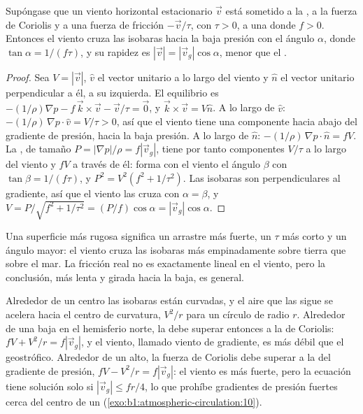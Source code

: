 \begin{proposition}\label{prop:b1:atmospheric-circulation:friction}
Supóngase que un viento horizontal estacionario $\vec v$ está sometido a la , a la fuerza de Coriolis y a una fuerza de fricción $-\vec v/\tau$, con $\tau > 0$, a una  donde $f > 0$. Entonces el viento cruza las isobaras hacia la baja presión con el ángulo $\alpha$, donde $\tan\alpha = 1/(f\tau)$, y su rapidez es $|\vec v| =
|\vec v_g|\cos\alpha$, menor que el .
\end{proposition}

\begin{proof}
Sea $V = |\vec v|$, $\hat v$ el vector unitario a lo largo del viento y $\hat n$ el vector unitario perpendicular a él, a su izquierda. El equilibrio es $-(1/\rho)\nabla p - f\,
\vec k\times\vec v - \vec v/\tau = \vec 0$, y $\vec k\times\vec v = V\hat n$.
A lo largo de $\hat v$: $-(1/\rho)\,\nabla p\cdot\hat v = V/\tau > 0$, así que el viento tiene una componente hacia abajo del gradiente de presión, hacia la baja presión. A lo largo de $\hat n$:
$-(1/\rho)\,\nabla p\cdot\hat n = fV$. La , de tamaño $P =
|\nabla p|/\rho = f|\vec v_g|$, tiene por tanto componentes $V/\tau$ a lo largo del viento y
$fV$ a través de él: forma con el viento el ángulo $\beta$ con $\tan\beta =
1/(f\tau)$, y $P^2 = V^2(f^2 + 1/\tau^2)$. Las isobaras son perpendiculares al
gradiente, así que el viento las cruza con $\alpha = \beta$, y $V = P/\sqrt{f^2 +
1/\tau^2} = (P/f)\cos\alpha = |\vec v_g|\cos\alpha$.
\end{proof}

Una superficie más rugosa significa un arrastre más fuerte, un $\tau$ más corto y un ángulo mayor: el viento cruza las isobaras más empinadamente sobre tierra que sobre el mar. La fricción real no es exactamente lineal en el viento, pero la conclusión, más lenta y girada hacia la baja, es general.

\begin{remark}\label{rem:b1:atmospheric-circulation:gradient}
Alrededor de un centro las isobaras están curvadas, y el aire que las sigue se acelera hacia el centro de curvatura, $V^2/r$ para un círculo de radio $r$. Alrededor de una baja en el hemisferio norte, la  debe superar entonces a la de Coriolis: $fV + V^2/r = f|\vec v_g|$, y el viento, llamado viento de gradiente, es más débil que el geostrófico. Alrededor de un alto, la fuerza de Coriolis debe superar a la del gradiente de presión, $fV - V^2/r = f|\vec v_g|$: el viento es más fuerte, pero la ecuación tiene solución solo si $|\vec v_g| \leq fr/4$, lo que prohíbe gradientes de presión fuertes cerca del centro de un  (\cref{exo:b1:atmospheric-circulation:10}).
\end{remark}

